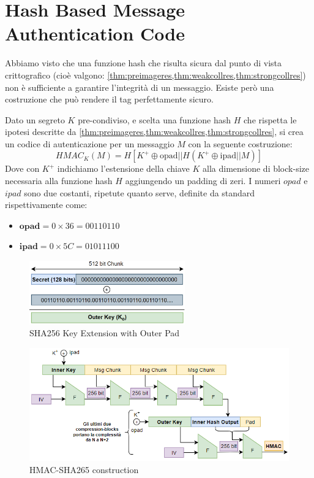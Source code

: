 \section{Hash Based Message Authentication Code}
Abbiamo visto che una funzione hash che risulta sicura dal punto di vista crittografico (cioè valgono: \cref{thm:preimageres,thm:weakcollres,thm:strongcollres}) non è sufficiente a garantire l'integrità di un messaggio. Esiste però una costruzione che può rendere il tag perfettamente sicuro. 
\begin{definition}\label{def:hmac}
Dato un segreto $K$ pre-condiviso, e scelta una funzione hash $H$ che rispetta le ipotesi descritte da \cref{thm:preimageres,thm:weakcollres,thm:strongcollres}, si crea un codice di autenticazione per un messaggio $M$ con la seguente costruzione:
\begin{equation}\label{eq:hmac}
HMAC_K(M)=H[K^+\oplus{\text{opad}}||H(K^+\oplus{\text{ipad}}||M)]
\end{equation}
Dove con $K^+$ indichiamo l'estensione della chiave $K$ alla dimensione di block-size necessaria alla funzione hash $H$ aggiungendo un padding di zeri. I numeri $opad$ e $ipad$ sono due costanti, ripetute quanto serve, definite da standard rispettivamente come:
\begin{itemize}
    \item $\textbf{opad}=0\times36=00110110$
    \item $\textbf{ipad}=0\times5C=01011100$
\end{itemize}
\end{definition}
\begin{figure}[H]
    \centering
    \includegraphics[width=0.6\textwidth]{image/hmackplus.png}
    \caption{SHA256 Key Extension with Outer Pad}
    \label{fig:hmackplus}
\end{figure}
\begin{figure}[H]
    \centering
    \includegraphics[width=0.8\linewidth]{image/hmac.png}
    \caption{HMAC-SHA265 construction}
    \label{fig:hmacsha256}
\end{figure}
